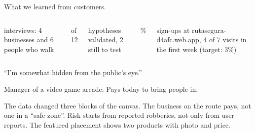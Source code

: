 \documentclass[aspectratio=169,11pt]{beamer}
\newcommand{\cifra}[1]{{\serif\color{ink}\fontsize{30}{30}\selectfont #1}}
\newcommand{\etiqueta}[1]{{\sansregular\fontsize{9}{11.5}\selectfont\color{inkmuted}#1}}
\begin{document}
\begin{frame}{What we learned from customers.}
  \vskip3mm
  \begin{columns}[T, onlytextwidth]
    \raggedright
      \cifra{10}\par\vskip1.5mm\etiqueta{interviews: 4 businesses and 6 people who walk}
    \raggedright
      \cifra{10 of 12}\par\vskip1.5mm\etiqueta{hypotheses validated, 2 still to test}
    \raggedright
      \cifra{57\%}\par\vskip1.5mm\etiqueta{sign-ups at rutasegura-d4afc.web.app, 4 of 7 visits in
        the first week (target: 3\%)}
  \end{columns}
  \vskip4mm
  {\serif\color{ink}\fontsize{15}{19}\selectfont “I'm somewhat hidden from the public's
    eye.”\par}
  \vskip1.5mm
  \etiqueta{Manager of a video game arcade. Pays today to bring people in.}
  \vskip4mm
  {\fontsize{10}{13}\selectfont The data changed three blocks of the canvas. The business on
    the route pays, not one in a “safe zone”. Risk starts from reported robberies, not only
    from user reports. The featured placement shows two products with photo and price.\par}
\end{frame}
\end{document}
